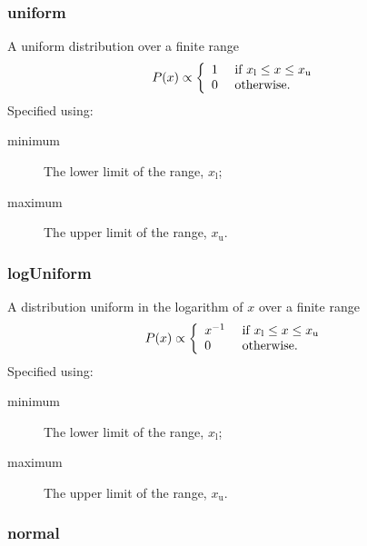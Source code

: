 \subsubsection{{\normalfont \ttfamily uniform}}

A uniform distribution over a finite range
\begin{equation}
P(x) \propto \left\{ \begin{array}{ll} 1 & \hbox{ if } x_{\mathrm l} \leq x \leq x_{\mathrm u} \\ 0 & \hbox{ otherwise.}  \end{array} \right.
\end{equation}
Specified using:
\begin{description}
\item[{\normalfont \ttfamily minimum}] The lower limit of the range, $x_{\mathrm l}$;
\item[{\normalfont \ttfamily maximum}] The upper limit of the range, $x_{\mathrm u}$.
\end{description}

\subsubsection{{\normalfont \ttfamily logUniform}}

A distribution uniform in the logarithm of $x$ over a finite range
\begin{equation}
P(x) \propto \left\{ \begin{array}{ll} x^{-1} & \hbox{ if } x_{\mathrm l} \leq x \leq x_{\mathrm u} \\ 0 & \hbox{ otherwise.}  \end{array} \right.
\end{equation}
Specified using:
\begin{description}
\item[{\normalfont \ttfamily minimum}] The lower limit of the range, $x_{\mathrm l}$;
\item[{\normalfont \ttfamily maximum}] The upper limit of the range, $x_{\mathrm u}$.
\end{description}

\subsubsection{{\normalfont \ttfamily normal}}

